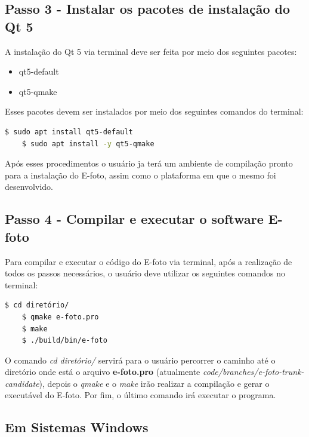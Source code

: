 \subsection{Passo 3 - Instalar os pacotes de instalação do Qt 5}   
A instalação do Qt 5 via terminal deve ser feita por meio dos seguintes pacotes:
\begin{itemize}
	\item qt5-default
	\item qt5-qmake
\end{itemize}   
Esses pacotes devem ser instalados por meio dos seguintes comandos do terminal:
\begin{lstlisting}[language=bash]
	$ sudo apt install qt5-default
	$ sudo apt install -y qt5-qmake
\end{lstlisting}	
    
Após esses procedimentos o usuário ja terá um ambiente de compilação pronto para a instalação do E-foto, assim como o plataforma em que o mesmo foi desenvolvido.
    
\subsection{Passo 4 - Compilar e executar o software E-foto}
Para compilar e executar o código do E-foto via terminal, após a realização de todos os passos necessários, o usuário deve utilizar os seguintes comandos no terminal:
\begin{lstlisting}[language=bash]
   	$ cd diretório/
   	$ qmake e-foto.pro
   	$ make
   	$ ./build/bin/e-foto
\end{lstlisting}
   
O comando \textit{cd diretório/} servirá para o usuário percorrer o caminho até o diretório onde está o arquivo \textbf{e-foto.pro} (atualmente \textit{code/branches/e-foto-trunk-candidate}), depois o \textit{qmake} e o \textit{make} irão realizar a compilação e gerar o executável do E-foto. Por fim, o último comando irá executar o programa.

\subsection{Em Sistemas Windows}

